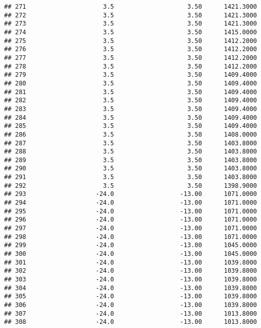 \documentclass[]{article}
\begin{document}
\begin{verbatim}
## 271                     3.5                    3.50      1421.3000
## 272                     3.5                    3.50      1421.3000
## 273                     3.5                    3.50      1421.3000
## 274                     3.5                    3.50      1415.0000
## 275                     3.5                    3.50      1412.2000
## 276                     3.5                    3.50      1412.2000
## 277                     3.5                    3.50      1412.2000
## 278                     3.5                    3.50      1412.2000
## 279                     3.5                    3.50      1409.4000
## 280                     3.5                    3.50      1409.4000
## 281                     3.5                    3.50      1409.4000
## 282                     3.5                    3.50      1409.4000
## 283                     3.5                    3.50      1409.4000
## 284                     3.5                    3.50      1409.4000
## 285                     3.5                    3.50      1409.4000
## 286                     3.5                    3.50      1408.0000
## 287                     3.5                    3.50      1403.8000
## 288                     3.5                    3.50      1403.8000
## 289                     3.5                    3.50      1403.8000
## 290                     3.5                    3.50      1403.8000
## 291                     3.5                    3.50      1403.8000
## 292                     3.5                    3.50      1398.9000
## 293                   -24.0                  -13.00      1071.0000
## 294                   -24.0                  -13.00      1071.0000
## 295                   -24.0                  -13.00      1071.0000
## 296                   -24.0                  -13.00      1071.0000
## 297                   -24.0                  -13.00      1071.0000
## 298                   -24.0                  -13.00      1071.0000
## 299                   -24.0                  -13.00      1045.0000
## 300                   -24.0                  -13.00      1045.0000
## 301                   -24.0                  -13.00      1039.8000
## 302                   -24.0                  -13.00      1039.8000
## 303                   -24.0                  -13.00      1039.8000
## 304                   -24.0                  -13.00      1039.8000
## 305                   -24.0                  -13.00      1039.8000
## 306                   -24.0                  -13.00      1039.8000
## 307                   -24.0                  -13.00      1013.8000
## 308                   -24.0                  -13.00      1013.8000

\end{verbatim}
\end{document}
